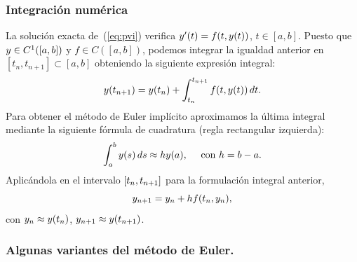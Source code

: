 \subsubsection*{Integración numérica}
La solución exacta de~(\ref{eq:pvi}) verifica $y'(t) = f(t, y(t))$,
$t\in [a,b]$. Puesto que $y\in C^1([a,b])$ y $f\in C([a,b])$,
podemos integrar la igualdad anterior en $[t_n,t_{n+1}] \subset [a,b]$
obteniendo la siguiente expresión integral:
\begin{equation}
  \label{eq:tema4.5}
  y({t_{n+1}}) = y({t_n}) + \int_{t_n}^{t_{n+1}} f(t,y(t))\, dt.
\end{equation}
Para obtener el método de Euler implícito aproximamos la última
integral mediante la siguiente fórmula de cuadratura (regla
rectangular izquierda):
\begin{equation*}
  \int_a^b y(s)\,ds \approx hy(a), \quad \text{ con $h=b-a$}.
\end{equation*}
Aplicándola en el intervalo $[{t_n},{t_{n+1}}]$ para la formulación integral
anterior,
\begin{equation*}
  {y_{n+1}} =  {y_n} + h f({t_n},{y_n}),
\end{equation*}
con ${y_n}\approx y({t_n})$, ${y_{n+1}}\approx y({t_{n+1}})$.

%

\subsubsection*{Algunas variantes del método de Euler.}

